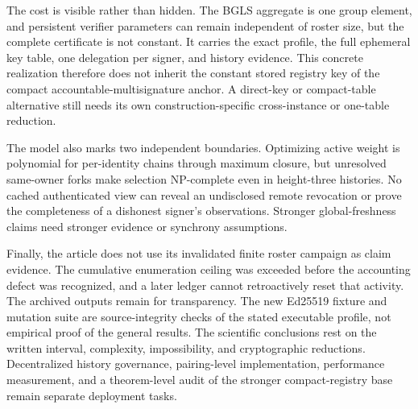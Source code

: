 \documentclass[11pt]{article}
\theoremstyle{definition}
\begin{document}
The cost is visible rather than hidden.  The BGLS aggregate is one group element, and persistent verifier parameters can remain independent of roster size, but the complete certificate is not constant.  It carries the exact profile, the full ephemeral key table, one delegation per signer, and history evidence.  This concrete realization therefore does not inherit the constant stored registry key of the compact accountable-multisignature anchor.  A direct-key or compact-table alternative still needs its own construction-specific cross-instance or one-table reduction.

The model also marks two independent boundaries.  Optimizing active weight is polynomial for per-identity chains through maximum closure, but unresolved same-owner forks make selection NP-complete even in height-three histories.  No cached authenticated view can reveal an undisclosed remote revocation or prove the completeness of a dishonest signer's observations.  Stronger global-freshness claims need stronger evidence or synchrony assumptions.

Finally, the article does not use its invalidated finite roster campaign as claim evidence.  The cumulative enumeration ceiling was exceeded before the accounting defect was recognized, and a later ledger cannot retroactively reset that activity.  The archived outputs remain for transparency.  The new Ed25519 fixture and mutation suite are source-integrity checks of the stated executable profile, not empirical proof of the general results.  The scientific conclusions rest on the written interval, complexity, impossibility, and cryptographic reductions.  Decentralized history governance, pairing-level implementation, performance measurement, and a theorem-level audit of the stronger compact-registry base remain separate deployment tasks.
\end{document}
